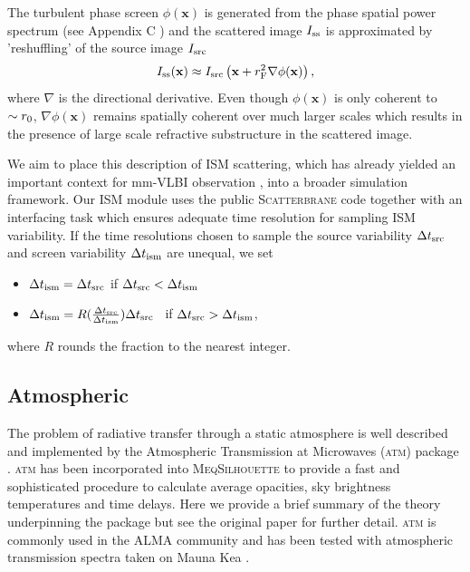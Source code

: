The turbulent phase screen $\phi(\mathbf{x})$ is generated from the phase spatial power spectrum (see Appendix C \citet*{Johnson_2015a}) and the scattered image $I_{\rm ss}$ is approximated by 'reshuffling' of the source image $I_{\rm src}$
\begin{equation}
I_{\rm ss}(\mathbf{x}) \approx I_{\rm src}\left(\mathbf{x} + r_{\rm F}^2 \nabla \phi(\mathbf{x})\right),
\end{equation}
where $\nabla$ is the directional derivative. Even though $\phi(\mathbf{x})$ is only coherent to $\sim r_{\rm 0}$, $\nabla \phi(\mathbf{x})$ remains spatially coherent over much larger scales which results in the presence of large scale refractive substructure in the scattered image. 


We aim to place this description of ISM scattering, which has already yielded an important context for mm-VLBI observation \citep[e.g.][]{2016arXiv160106571O}, into a broader simulation framework. Our ISM module uses the public \textsc{Scatterbrane} code together with an interfacing task which ensures adequate time resolution for sampling ISM variability. If the time resolutions chosen to sample the source variability $\Delta t_{\rm src}$ and screen variability $\Delta t_{\rm ism}$ are unequal, we set  
\begin{itemize}
 \setlength\itemsep{1em}
\item $\Delta t_{\rm ism}=\Delta t_{\rm src}$ \qquad \qquad if \qquad  $\Delta t_{\rm src} < \Delta t_{\rm ism}$
\item $\Delta t_{\rm ism}=R(\frac{\Delta t_{\rm src}}{\Delta t_{\rm ism}})\Delta t_{\rm src}$ \ if \qquad  $\Delta t_{\rm src} > \Delta t_{\rm ism}$,
\end{itemize}
where $R$ rounds the fraction to the nearest integer. 



\subsection{Atmospheric}
The problem of radiative transfer through a static atmosphere is well described and implemented by the Atmospheric Transmission at Microwaves (\textsc{atm}) package \citep{Pardo_2001}. \textsc{atm} has been incorporated into \textsc{MeqSilhouette} to provide a fast and sophisticated procedure to calculate average opacities, sky brightness temperatures and time delays. Here we provide a brief summary of the theory underpinning the package but see the original paper for further detail. \textsc{atm} is commonly used in the ALMA community \citep{Curtis_2009,Nikolic_2013} and has been tested with atmospheric transmission spectra taken on Mauna Kea \citep{Serabyn_1998}.


